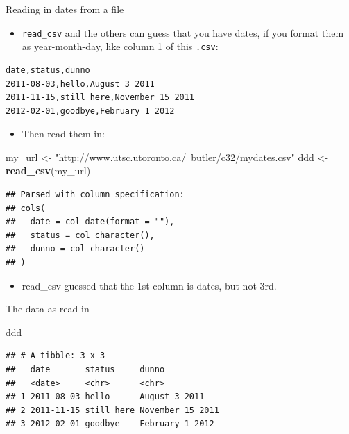 \documentclass[ignorenonframetext,]{beamer}
\newenvironment{Shaded}{\begin{snugshade}}{\end{snugshade}}
\newcommand{\KeywordTok}[1]{\textcolor[rgb]{0.13,0.29,0.53}{\textbf{#1}}}
\newcommand{\NormalTok}[1]{#1}
\newcommand{\StringTok}[1]{\textcolor[rgb]{0.31,0.60,0.02}{#1}}
\providecommand{\tightlist}{%
  \setlength{\itemsep}{0pt}\setlength{\parskip}{0pt}}
\begin{document}
\begin{frame}[fragile]{Reading in dates from a file}
\protect\hypertarget{reading-in-dates-from-a-file}{}

\begin{itemize}
\tightlist
\item
  \texttt{read\_csv} and the others can guess that you have dates, if
  you format them as year-month-day, like column 1 of this
  \texttt{.csv}:
\end{itemize}

\begin{verbatim}
date,status,dunno
2011-08-03,hello,August 3 2011
2011-11-15,still here,November 15 2011
2012-02-01,goodbye,February 1 2012
\end{verbatim}

\begin{itemize}
\tightlist
\item
  Then read them in:
\end{itemize}

\begin{Shaded}
\begin{Highlighting}[]
\NormalTok{my_url <-}\StringTok{ "http://www.utsc.utoronto.ca/~butler/c32/mydates.csv"}
\NormalTok{ddd <-}\StringTok{ }\KeywordTok{read_csv}\NormalTok{(my_url)}
\end{Highlighting}
\end{Shaded}

\begin{verbatim}
## Parsed with column specification:
## cols(
##   date = col_date(format = ""),
##   status = col_character(),
##   dunno = col_character()
## )
\end{verbatim}

\begin{itemize}
\tightlist
\item
  read\_csv guessed that the 1st column is dates, but not 3rd.
\end{itemize}

\end{frame}

\begin{frame}[fragile]{The data as read in}
\protect\hypertarget{the-data-as-read-in}{}

\begin{Shaded}
\begin{Highlighting}[]
\NormalTok{ddd}
\end{Highlighting}
\end{Shaded}

\begin{verbatim}
## # A tibble: 3 x 3
##   date       status     dunno           
##   <date>     <chr>      <chr>           
## 1 2011-08-03 hello      August 3 2011   
## 2 2011-11-15 still here November 15 2011
## 3 2012-02-01 goodbye    February 1 2012
\end{verbatim}

\end{frame}
\end{document}
